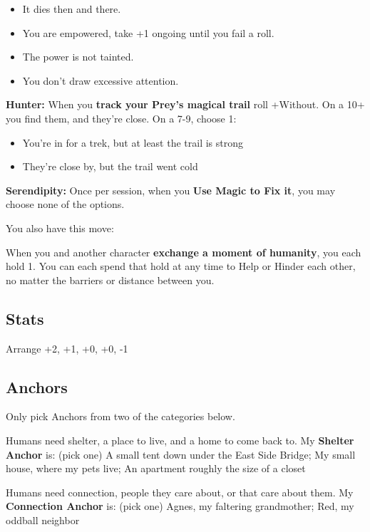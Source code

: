 \documentclass[
  oneside,
  statementpaper,
  9pt]{memoir}
\begin{document}
\begin{itemize}
\tightlist
\item
  It dies then and there.
\item
  You are empowered, take +1 ongoing until you fail a roll.
\item
  The power is not tainted.
\item
  You don't draw excessive attention.
\end{itemize}

\textbf{Hunter:} When you \textbf{track your Prey's magical trail} roll
+Without. On a 10+ you find them, and they're close. On a 7-9, choose 1:

\begin{itemize}
\tightlist
\item
  You're in for a trek, but at least the trail is strong
\item
  They're close by, but the trail went cold
\end{itemize}

\textbf{Serendipity:} Once per session, when you \textbf{Use Magic to
Fix it}, you may choose none of the options.

You also have this move:

When you and another character \textbf{exchange a moment of humanity},
you each hold 1. You can each spend that hold at any time to Help or
Hinder each other, no matter the barriers or distance between you.

\hypertarget{stats-7}{%
\subsection{Stats}\label{stats-7}}

Arrange +2, +1, +0, +0, -1

\hypertarget{anchors-7}{%
\subsection{Anchors}\label{anchors-7}}

Only pick Anchors from two of the categories below.

Humans need shelter, a place to live, and a home to come back to. My
\textbf{Shelter Anchor} is: (pick one) A small tent down under the East
Side Bridge; My small house, where my pets live; An apartment roughly
the size of a closet

Humans need connection, people they care about, or that care about them.
My \textbf{Connection Anchor} is: (pick one) Agnes, my faltering
grandmother; Red, my oddball neighbor
\end{document}

